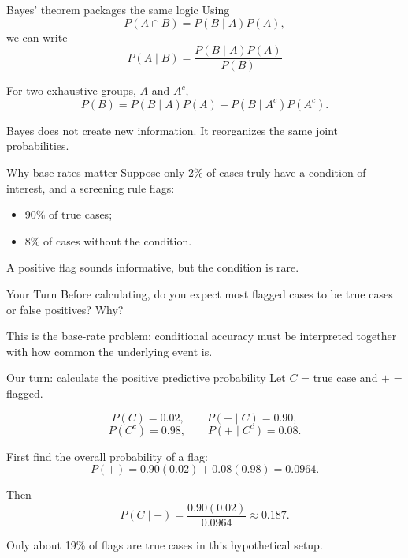 \documentclass[11pt,aspectratio=169]{beamer}
\newcommand{\yourturn}[1]{%
\begin{center}
\begin{minipage}{0.90\textwidth}
\begin{alertblock}{Your Turn}
#1
\end{alertblock}
\end{minipage}
\end{center}}
\newcommand{\prob}[1]{P\!\left(#1\right)}
\newcommand{\condprob}[2]{P\!\left(#1\mid #2\right)}
\begin{document}
\begin{frame}{Bayes' theorem packages the same logic}
Using
\[
\prob{A\cap B}=\condprob{B}{A}\prob{A},
\]
we can write
\[
\boxed{
\condprob{A}{B}
=\frac{\condprob{B}{A}\prob{A}}{\prob{B}}
}
\]

For two exhaustive groups, $A$ and $A^c$,
\[
\prob{B}=\condprob{B}{A}\prob{A}
+\condprob{B}{A^c}\prob{A^c}.
\]

\vfill
\alert{Bayes does not create new information. It reorganizes the same joint probabilities.}
\end{frame}

\begin{frame}{Why base rates matter}
Suppose only 2\% of cases truly have a condition of interest, and a screening rule flags:
\begin{itemize}
  \item 90\% of true cases;
  \item 8\% of cases without the condition.
\end{itemize}

A positive flag sounds informative, but the condition is rare.

\vspace{0.7em}
\yourturn{Before calculating, do you expect most flagged cases to be true cases or false positives? Why?}

\vfill
\small
This is the \alert{base-rate problem}: conditional accuracy must be interpreted together with how common the underlying event is.
\end{frame}

\begin{frame}{Our turn: calculate the positive predictive probability}
Let $C$ = true case and $+$ = flagged.

\[
\prob{C}=0.02,\qquad \condprob{+}{C}=0.90,
\]
\[
\prob{C^c}=0.98,\qquad \condprob{+}{C^c}=0.08.
\]

First find the overall probability of a flag:
\[
\prob{+}=0.90(0.02)+0.08(0.98)=0.0964.
\]

Then
\[
\condprob{C}{+}
=\frac{0.90(0.02)}{0.0964}
\approx\boxed{0.187}.
\]

Only about 19\% of flags are true cases in this hypothetical setup.
\end{frame}
\end{document}
